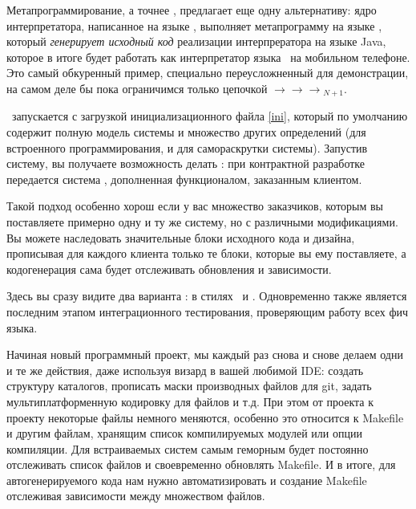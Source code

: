 \bigskip
Метапрограммирование, а точнее , предлагает еще одну
альтернативу: ядро интерпретатора, написанное на языке \py, выполняет
метапрограмму на языке \hico, который \emph{генерирует исходный код} реализации
интерпрератора на языке Java, которое в итоге будет работать как интерпретатор языка \F\ на
мобильном телефоне. Это самый обкуренный пример, специально переусложненный
для демонстрации, на самом деле бы пока ограничимся только цепочкой
\py$\rightarrow$\hico$\rightarrow$\py$\rightarrow$\hico$_{N+1}$.


\hico\ запускается с загрузкой инициализационного файла 
\ref{ini}, который по умолчанию содержит полную модель системы и множество
других определений (для встроенного программирования, и для самораскрутки
системы). Запустив систему, вы получаете возможность делать : при контрактной разработке передается система \hico,
дополненная функционалом, заказанным клиентом.

Такой подход особенно хорош если у вас множество заказчиков, которым вы
поставляете примерно одну и ту же систему, но с различными модификациями. Вы
можете наследовать значительные блоки исходного кода и дизайна,
прописывая для каждого клиента только те блоки, которые вы ему поставляете, а
кодогенерация сама будет отслеживать обновления и зависимости.

\clearpage
{}
Здесь вы сразу видите два варианта : в стилях \py\ и
\F. Одновременно  также является последним этапом интеграционного
тестирования, проверяющим работу всех фич языка.

\label{circfiles}


Начиная новый программный проект, мы каждый раз снова и снове делаем одни и те
же действия, даже используя визард в вашей любимой IDE: создать структуру
каталогов, прописать маски производных файлов для git, задать
мультиплатформенную кодировку для файлов и т.д. При этом от проекта к проекту
некоторые файлы немного меняются, особенно это относится к Makefile и другим
файлам, хранящим список компилируемых модулей или опции компиляции.
Для встраиваемых систем самым геморным будет постоянно отслеживать список файлов
и своевременно обновлять Makefile. И в итоге, для
автогенерируемого кода нам нужно автоматизировать и создание Makefile отслеживая
зависимости между множеством файлов.

\secup
